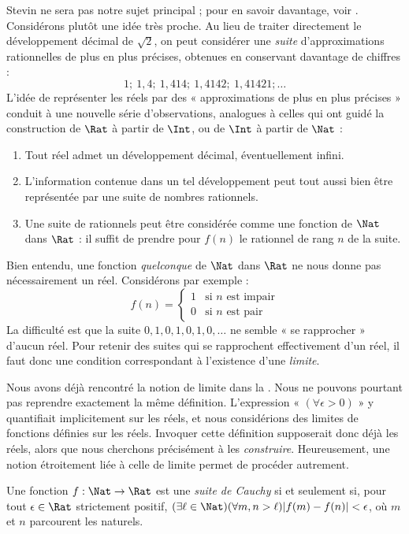 \documentclass[../../../include/open-logic-section]{subfiles}
\begin{document}
Stevin ne sera pas notre sujet principal ; pour en savoir davantage,
voir \citealt{KatzKatz2012}. Considérons plutôt une idée très proche.
Au lieu de traiter directement le développement décimal de $\sqrt{2}$,
on peut considérer une \emph{suite} d'approximations rationnelles de
plus en plus précises, obtenues en conservant davantage de chiffres :
\[
1;\ 1{,}4;\ 1{,}414;\ 1{,}4142;\ 1{,}41421;\ldots
\]
L'idée de représenter les réels par des « approximations de plus en
plus précises » conduit à une nouvelle série d'observations, analogues
à celles qui ont guidé la construction de $\Rat$ à partir de $\Int$,
ou de $\Int$ à partir de $\Nat$ :
\begin{enumerate}
\item Tout réel admet un développement décimal, éventuellement infini.
\item L'information contenue dans un tel développement peut tout aussi
bien être représentée par une suite de nombres rationnels.
\item Une suite de rationnels peut être considérée comme une fonction
de $\Nat$ dans $\Rat$ : il suffit de prendre pour $f(n)$ le rationnel
de rang $n$ de la suite.
\end{enumerate}
Bien entendu, une fonction \emph{quelconque} de $\Nat$ dans $\Rat$
ne nous donne pas nécessairement un réel. Considérons par exemple :
\[
f(n)=\begin{cases}
1 &\text{si }n\text{ est impair}\\
0 &\text{si }n\text{ est pair}
\end{cases}
\]
La difficulté est que la suite $0,1,0,1,0,1,0,\ldots$ ne semble
« se rapprocher » d'aucun réel. Pour retenir des suites qui se rapprochent
effectivement d'un réel, il faut donc une condition correspondant à
l'existence d'une \emph{limite}.

Nous avons déjà rencontré la notion de limite dans la
. Nous ne pouvons pourtant pas reprendre
exactement la même définition. L'expression « $(\forall\epsilon>0)$ »
y quantifiait implicitement sur les réels, et nous considérions des
limites de fonctions définies sur les réels. Invoquer cette définition
supposerait donc déjà les réels, alors que nous cherchons précisément
à les \emph{construire}. Heureusement, une notion étroitement liée à
celle de limite permet de procéder autrement.
\begin{defn}
Une fonction $f:\Nat\to\Rat$ est une \emph{suite de Cauchy} si et
seulement si, pour tout $\epsilon\in\Rat$ strictement positif,
$(\exists\ell\in\Nat)(\forall m,n>\ell)|f(m)-f(n)|<\epsilon$,
où $m$ et $n$ parcourent les naturels.
\end{defn}
\end{document}
